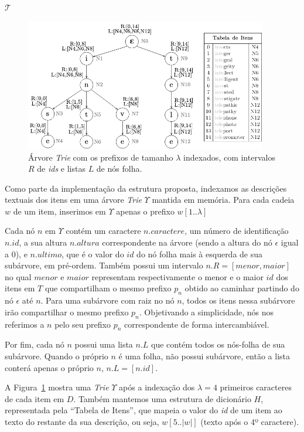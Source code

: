 $\mathcal{T}$
 
 \begin{figure} [ht]
    \centering
    \includegraphics[width=0.94\textwidth]{figures/index-structure.png}
    \caption{Árvore \textit{Trie} com os prefixos de tamanho $\lambda$ indexados, com intervalos $R$ de \textit{ids} e listas $L$ de nós folha.}
    \label{fig:index_structure}
\end{figure}

 
Como parte da implementação da estrutura proposta, indexamos as descrições textuais dos itens em uma árvore \textit{Trie} $\Upsilon$ mantida em memória. Para cada cadeia $w$ de um item, inserimos em $\Upsilon$ apenas o prefixo $w[1..\lambda]$ 

Cada nó $n$ em $\Upsilon$ contém um caractere $n.caractere$, um número de identificação $n.id$, a sua altura $n.altura$ correspondente na árvore (sendo a altura do nó $\epsilon$ igual a 0), e $n.ultimo$, que é o valor do $id$ do nó folha mais à esquerda de sua subárvore, em pré-ordem. Também possui um intervalo $n.R = [menor, maior]$ no qual $menor$ e $maior$ representam respectivamente o menor e o maior $id$ dos itens em $T$ que compartilham o mesmo prefixo $p_{n}$ obtido ao caminhar partindo do nó $\epsilon$ até $n$. Para uma subárvore com raiz no nó $n$, todos os itens nessa subárvore irão compartilhar o mesmo prefixo $p_{n}$. Objetivando a simplicidade, nós nos referimos a $n$ pelo seu prefixo $p_{n}$ correspondente de forma intercambiável. 

Por fim, cada nó $n$ possui uma lista $n.L$ que contém todos os nós-folha de sua subárvore. Quando o próprio $n$ é uma folha, não possui subárvore, então a lista conterá apenas o próprio $n$, $n.L = [n.id]$.

A Figura~\ref{fig:index_structure} mostra uma \textit{Trie} $\Upsilon$ após a indexação dos $\lambda = 4$ primeiros caracteres de cada item em $D$. Também mantemos uma estrutura de dicionário $H$, representada pela ``Tabela de Itens'', que mapeia o valor do \textit{id} de um item ao texto do restante da sua descrição, ou seja, $w[5..|w|]$ (texto após o 4º caractere).


